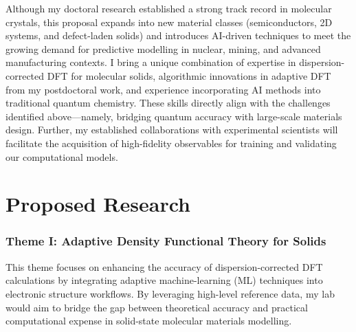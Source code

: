 \documentclass[11pt,letterpaper]{article}
\begin{document}
Although my doctoral research established a strong track record in molecular crystals, this proposal expands into new material classes (semiconductors, 2D systems, and defect-laden solids) and introduces AI-driven techniques to meet the growing demand for predictive modelling in nuclear, mining, and advanced manufacturing contexts.
I bring a unique combination of expertise in dispersion-corrected DFT for molecular solids, algorithmic innovations in adaptive DFT from my postdoctoral work, and experience incorporating AI methods into traditional quantum chemistry. These skills directly align with the challenges identified above—namely, bridging quantum accuracy with large-scale materials design. Further, my established collaborations with experimental scientists will facilitate the acquisition of high-fidelity observables for training and validating our computational models.

\section{Proposed Research}

\subsubsection*{Theme I: Adaptive Density Functional Theory for Solids}

This theme focuses on enhancing the accuracy of dispersion-corrected DFT calculations by integrating adaptive machine-learning (ML) techniques into electronic structure workflows\cite{apbe0}. By leveraging high-level reference data, my lab would aim to bridge the gap between theoretical accuracy and practical computational expense in solid-state molecular materials modelling.  
\end{document}
